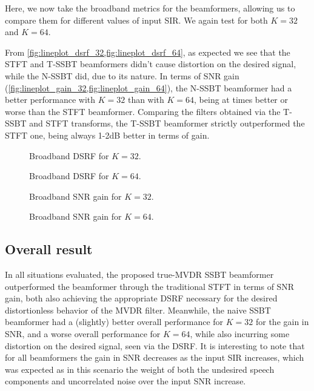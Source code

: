 Here, we now take the broadband metrics for the beamformers, allowing us to compare them for different values of input SIR. We again test for both $K = 32$ and $K = 64$.

From \cref{fig:lineplot_dsrf_32,fig:lineplot_dsrf_64}, as expected we see that the STFT and T-SSBT beamformers didn't cause distortion on the desired signal, while the N-SSBT did, due to its nature. In terms of SNR gain (\cref{fig:lineplot_gain_32,fig:lineplot_gain_64}), the N-SSBT beamformer had a better performance with $K = 32$ than with $K = 64$, being at times better or worse than the STFT beamformer. Comparing the filters obtained via the T-SSBT and STFT transforms, the T-SSBT beamformer strictly outperformed the STFT one, being always 1-2dB better in terms of gain.

\begin{figure}[H]
	\centering
	
	\caption{Broadband DSRF for $K = 32$.}
	\label{fig:lineplot_dsrf_32}
\end{figure}

\begin{figure}[H]
	\centering
	
	\caption{Broadband DSRF for $K = 64$.}
	\label{fig:lineplot_dsrf_64}
\end{figure}

\begin{figure}[H]
	\centering
	
	\caption{Broadband SNR gain for $K = 32$.}
	\label{fig:lineplot_gain_32}
\end{figure}

\begin{figure}[H]
	\centering
	
	\caption{Broadband SNR gain for $K = 64$.}
	\label{fig:lineplot_gain_64}
	\end{figure}

\subsection{Overall result}

In all situations evaluated, the proposed true-MVDR SSBT beamformer outperformed the beamformer through the traditional STFT in terms of SNR gain, both also achieving the appropriate DSRF necessary for the desired distortionless behavior of the MVDR filter. Meanwhile, the naive SSBT beamformer had a (slightly) better overall performance for $K = 32$ for the gain in SNR, and a worse overall performance for $K = 64$, while also incurring some distortion on the desired signal, seen via the DSRF. It is interesting to note that for all beamformers the gain in SNR decreases as the input SIR increases, which was expected as in this scenario the weight of both the undesired speech components and uncorrelated noise over the input SNR increase.